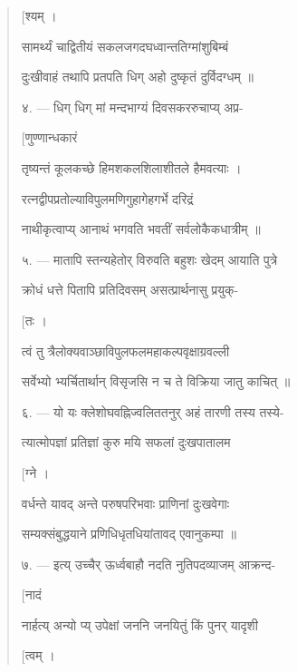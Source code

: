 \documentclass[a4paper, 11pt, oneside, french, landscape, twocolumn]{article}
\begin{document}
\begin{quotation}
\hspace*{55mm}\texthindi{[श्यम् ।}

\texthindi{सामर्थ्यं चाद्वितीयं सकलजगदघध्वान्ततिग्मांशुबिम्बं}

\texthindi{दुःखीवाहं तथापि प्रतपति धिग् अहो दुष्कृतं दुर्विदग्धम् ॥}

\bigskip

\texthindi{४}. --- \texthindi{धिग् धिग् मां मन्दभाग्यं दिवसकररुचाप्य् अप्र-}

\hspace*{55mm}\texthindi{[णुण्णान्धकारं}

\texthindi{तृष्यन्तं कूलकच्छे हिमशकलशिलाशीतले हैमवत्याः ।}

\texthindi{रत्नद्वीपप्रतोल्याविपुलमणिगुहागेहगर्भे दरिद्रं}

\texthindi{नाथीकृत्वाप्य् आनाथं भगवति भवतीं सर्वलोकैकधात्रीम् ॥}

\bigskip

\texthindi{५}. --- \texthindi{मातापि स्तन्यहेतोर् विरुवति बहुशः खेदम् आयाति पुत्रे}

\texthindi{क्रोधं धत्ते पितापि प्रतिदिवसम् असत्प्रार्थनासु प्रयुक्-}

\hspace*{55mm}\texthindi{[तः ।}

\texthindi{त्वं तु त्रैलोक्यवाञ्छाविपुलफलमहाकल्पवृक्षाग्रवल्ली}

\texthindi{सर्वेभ्यो भ्यर्चितार्थान् विसृजसि न च ते विक्रिया जातु काचित् ॥}

\bigskip

\texthindi{६}. --- \texthindi{यो यः क्लेशोघवह्निज्वलिततनुर् अहं तारणी तस्य तस्ये-}

\texthindi{त्यात्मोपज्ञां प्रतिज्ञां कुरु मयि सफलां दुःखपातालम}

\hspace*{55mm}\texthindi{[ग्ने ।}

\texthindi{वर्धन्ते यावद् अन्ते परुषपरिभवाः प्राणिनां दुःखवेगाः}

\texthindi{सम्यक्संबुद्धयाने प्रणिधिधृतधियांतावद् एवानुकम्पा ॥}

\bigskip

\texthindi{७}. --- \texthindi{इत्य् उच्चैर् ऊर्ध्वबाहौ नदति नुतिपदव्याजम् आक्रन्द-}

\hspace*{55mm}\texthindi{[नादं}

\texthindi{नार्हत्य् अन्यो प्य् उपेक्षां जननि जनयितुं किं पुनर् यादृशी}

\hspace*{55mm}\texthindi{[त्वम् ।}


\end{quotation}
\end{document}

